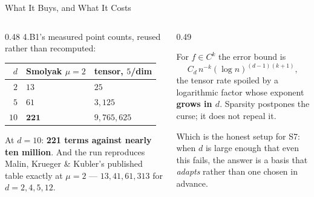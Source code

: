 \begin{frame}{What It Buys, and What It Costs}
\begin{columns}[T]
\begin{column}{0.48\textwidth}
\small
4.B1's measured point counts, reused rather than recomputed:
\medskip
\begin{center}\footnotesize
\begin{tabularx}{\linewidth}{@{}r >{\raggedleft\arraybackslash}X >{\raggedleft\arraybackslash}X@{}}
\toprule
$d$ & Smolyak $\mu=2$ & tensor, $5$/dim \\
\midrule
$2$ & $13$ & $25$ \\
$5$ & $61$ & $3{,}125$ \\
$10$ & $\mathbf{221}$ & $9{,}765{,}625$ \\
\bottomrule
\end{tabularx}
\end{center}
\medskip
At $d=10$: \textbf{221 terms against nearly ten million}. And the run reproduces Malin, Krueger \& Kubler's published table exactly at $\mu=2$ --- $13,41,61,313$ for $d=2,4,5,12$.
\end{column}
\begin{column}{0.49\textwidth}
\begin{cautionbox}[title=\textbf{The curse is weakened, not broken}]\small
For $f\in C^{k}$ the error bound is
\[
  C_d\,n^{-k}(\log n)^{(d-1)(k+1)} ,
\]
the tensor rate spoiled by a logarithmic factor whose exponent \textbf{grows in $d$}. Sparsity postpones the curse; it does not repeal it.
\end{cautionbox}
\medskip
\begin{examplebox}\footnotesize
Which is the honest setup for S7: when $d$ is large enough that even this fails, the answer is a basis that \emph{adapts} rather than one chosen in advance.
\end{examplebox}
\end{column}
\end{columns}
\vspace{1mm}
\end{frame}

